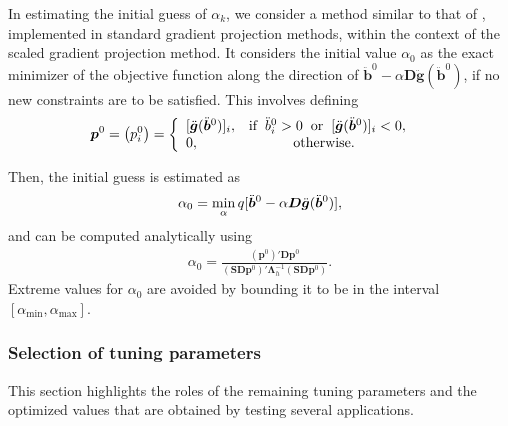 \documentclass[11pt]{article}
\newcommand{\0}{\phantom{0}}
\begin{document}
In estimating the initial guess of $\alpha_{k}$, we consider a method similar to that of \citet{Figueiredo2007}, implemented in standard gradient projection methods, within the context of the scaled gradient projection method. It considers the initial value $\alpha_{0}$ as the exact minimizer of the objective function along the direction of $\ddot{\bm{b}}^{0} - \alpha \bm{D} \ddot{\bm{g}}(\ddot{\bm{b}}^{0})$, if no new constraints are to be satisfied. This involves defining
\begin{align*}
\bm{p}^{0} = \left(p^{0}_{i}\right)& =
\left\{\begin{array}{ll}
[\ddot{\bm{g}}(\ddot{\bm{b}}^{0})]_{i}, & \mbox{$\text{if} \hspace{2mm} \ddot{b}_{i}^{0} > 0 \hspace{2mm} \text{or} \hspace{2mm} [\ddot{\bm{g}}(\ddot{\bm{b}}^{0})]_{i} < 0,$}\\
0, & \mbox{\hspace{1cm} \text{otherwise}}.
\end{array}\right.
\end{align*}

Then, the initial guess is estimated as 
\begin{align*}
\alpha_{0} = \operatornamewithlimits{min}_{\alpha} q[\ddot{\bm{b}}^{0} - \alpha \bm{D} \ddot{\bm{g}}(\ddot{\bm{b}}^{0})],
\end{align*}
and can be computed analytically using
\begin{align*}
\alpha_{0} = \frac{(\bm{p}^{0})'\bm{D}\bm{p}^{0}}{(\bm{S}\bm{D}\bm{p}^{0})'\bm{\Lambda}_{h}^{-1}(\bm{S}\bm{D}\bm{p}^{0})}.
\end{align*}
Extreme values for $\alpha_{0}$ are avoided by bounding it to be in the interval $[\alpha_{\text{min}}, \alpha_{\text{max}}]$.

\subsubsection*{Selection of tuning parameters}

This section highlights the roles of the remaining tuning parameters and the optimized values that are obtained by testing several applications. 
\end{document}
